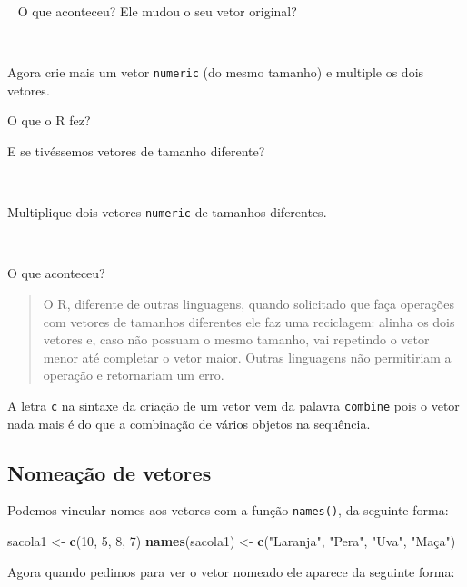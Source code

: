 \documentclass[]{book}
\newenvironment{Shaded}{\begin{snugshade}}{\end{snugshade}}
\newcommand{\DecValTok}[1]{\textcolor[rgb]{0.00,0.00,0.81}{#1}}
\newcommand{\KeywordTok}[1]{\textcolor[rgb]{0.13,0.29,0.53}{\textbf{#1}}}
\newcommand{\NormalTok}[1]{#1}
\newcommand{\StringTok}[1]{\textcolor[rgb]{0.31,0.60,0.02}{#1}}
\theoremstyle{definition}
\theoremstyle{definition}
\theoremstyle{definition}
\theoremstyle{remark}
\let\BeginKnitrBlock\begin \let\EndKnitrBlock\end
\begin{document}
~
O que aconteceu? Ele mudou o seu vetor original?

~
\BeginKnitrBlock{exercise}
\protect\hypertarget{exr:unnamed-chunk-23}{}{\label{exr:unnamed-chunk-23} }Agora crie mais um vetor \texttt{numeric} (do mesmo tamanho) e multiple os dois vetores.
\EndKnitrBlock{exercise}

O que o R fez?

E se tivéssemos vetores de tamanho diferente?

~
\BeginKnitrBlock{exercise}
\protect\hypertarget{exr:unnamed-chunk-24}{}{\label{exr:unnamed-chunk-24} }Multiplique dois vetores \texttt{numeric} de tamanhos diferentes.
\EndKnitrBlock{exercise}

~

O que aconteceu?

\begin{quote}
O R, diferente de outras linguagens, quando solicitado que faça operações com vetores de tamanhos diferentes ele faz uma reciclagem: alinha os dois vetores e, caso não possuam o mesmo tamanho, vai repetindo o vetor menor até completar o vetor maior. Outras linguagens não permitiriam a operação e retornariam um erro.
\end{quote}

A letra \texttt{c} na sintaxe da criação de um vetor vem da palavra \texttt{combine} pois o vetor nada mais é do que a combinação de vários objetos na sequência.

\hypertarget{nomeauxe7uxe3o-de-vetores}{%
\subsection{Nomeação de vetores}\label{nomeauxe7uxe3o-de-vetores}}

Podemos vincular nomes aos vetores com a função \texttt{names()}, da seguinte forma:

\begin{Shaded}
\begin{Highlighting}[]
\NormalTok{sacola1 <-}\StringTok{ }\KeywordTok{c}\NormalTok{(}\DecValTok{10}\NormalTok{, }\DecValTok{5}\NormalTok{, }\DecValTok{8}\NormalTok{, }\DecValTok{7}\NormalTok{)}
\KeywordTok{names}\NormalTok{(sacola1) <-}\StringTok{ }\KeywordTok{c}\NormalTok{(}\StringTok{"Laranja"}\NormalTok{, }\StringTok{"Pera"}\NormalTok{, }\StringTok{"Uva"}\NormalTok{, }\StringTok{"Maça"}\NormalTok{)}
\end{Highlighting}
\end{Shaded}

Agora quando pedimos para ver o vetor nomeado ele aparece da seguinte forma:
\end{document}
